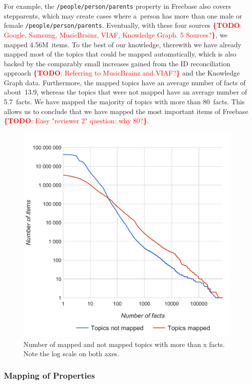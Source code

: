 \documentclass{sig-alternate}
\newcommand{\todo}[1]{\noindent\textcolor{red}{{\bf \{TODO}: #1{\bf \}}}}
\begin{document}
For example, the \texttt{/people/person/parents} property in Freebase also covers stepparents,
which may create cases where a~person has more than one male or female \texttt{/people/person/parents}.
Eventually, with these four sources \todo{Google, Samsung, MusicBrainz, VIAF, Knowledge Graph. 5 Sources?}, we mapped 4.56M~items.
To the best of our knowledge, therewith we have already mapped
most of the topics that could be mapped automatically, 
which is also backed by the comparably small increases gained from the ID reconciliation approach \todo{Referring to MusicBrainz and VIAF?}
and the Knowledge Graph data.
Furthermore, the mapped topics have an average number of facts of about~13.9,
whereas the topics that were not mapped have an average number of 5.7~facts.
We have mapped the majority of topics with more than 80~facts.
This allows us to conclude that we have mapped the most important items of Freebase \todo{Easy "reviewer 2" question: why 80?}.

\begin{figure}[!htbp]
\centering
\includegraphics[width=8.45 cm]{img/facts-topics-mapping.pdf}
\caption{Number of mapped and not mapped topics with more than x facts.
Note the log scale on both axes.}
\end{figure}

\subsubsection{Mapping of Properties}
\end{document}
